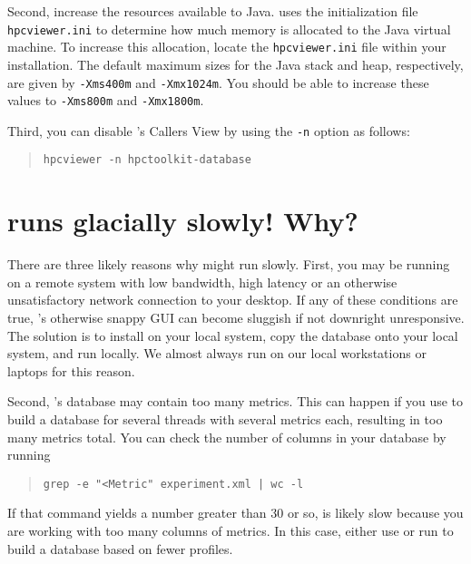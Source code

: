 \documentclass[11pt,letterpaper]{report}
\begin{document}
Second, increase the resources available to Java.
\hpcviewer{} uses the initialization file \texttt{hpcviewer.ini} to determine how much memory is allocated to the Java virtual machine.
To increase this allocation, locate the \texttt{hpcviewer.ini} file within your \hpcviewer{} installation.
The default maximum sizes for the Java stack and heap, respectively, are given by \texttt{-Xms400m} and \texttt{-Xmx1024m}.
You should be able to increase these values to \texttt{-Xms800m} and \texttt{-Xmx1800m}.

Third, you can disable \hpcviewer{}'s Callers View by using the \texttt{-n} option as follows:
\begin{quote}
  \verb|hpcviewer -n hpctoolkit-database|
\end{quote}


\section{\hpcviewer{} runs glacially slowly! Why?}

There are three likely reasons why \hpcviewer{} might run slowly.
First, you may be running \hpcviewer{} on a remote system with low bandwidth, high latency or an otherwise unsatisfactory network connection to your desktop.
If any of these conditions are true, \hpcviewer{}'s otherwise snappy GUI can become sluggish if not downright unresponsive.
The solution is to install \hpcviewer{} on your local system, copy the database onto your local system, and run \hpcviewer{} locally.
We almost always run \hpcviewer{} on our local workstations or laptops for this reason.

Second, \HPCToolkit{}'s database may contain too many metrics.
This can happen if you use \hpcprof{} to build a database for several threads with several metrics each, resulting in too many metrics total.
You can check the number of columns in your database by running
\begin{quote}
  \verb,grep -e "<Metric" experiment.xml | wc -l,
\end{quote}
If that command yields a number greater than 30 or so, \hpcviewer{} is likely slow because you are working with too many columns of metrics.
In this case, either use \hpcprofmpi{} or run \hpcprof{} to build a database based on fewer profiles.
\end{document}
